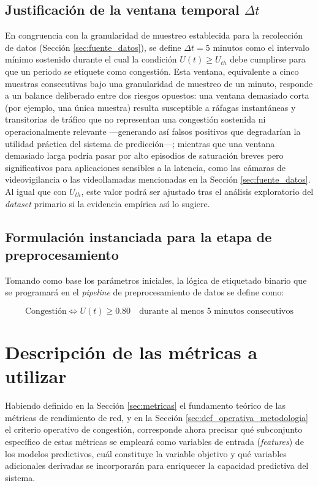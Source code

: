 \documentclass[12pt]{report}
\begin{document}
\subsection*{Justificación de la ventana temporal $\Delta t$}

En congruencia con la granularidad de muestreo establecida para la recolección de datos (Sección \ref{sec:fuente_datos}), se define $\Delta t = 5$ minutos como el intervalo mínimo sostenido durante el cual la condición $U(t) \geq U_{th}$ debe cumplirse para que un periodo se etiquete como congestión. Esta ventana, equivalente a cinco muestras consecutivas bajo una granularidad de muestreo de un minuto, responde a un balance deliberado entre dos riesgos opuestos: una ventana demasiado 
corta (por ejemplo, una única muestra) resulta susceptible a ráfagas instantáneas y transitorias de tráfico que no representan una congestión sostenida ni operacionalmente relevante ---generando así falsos positivos que degradarían la utilidad práctica del sistema de predicción---; mientras que una ventana demasiado larga podría pasar por alto episodios de saturación breves pero significativos para aplicaciones sensibles a la latencia, como las cámaras de videovigilancia o las 
videollamadas mencionadas en la Sección \ref{sec:fuente_datos}. Al igual que con $U_{th}$, este valor podrá ser ajustado tras el análisis exploratorio del \textit{dataset} primario si la evidencia empírica así lo sugiere.

\subsection*{Formulación instanciada para la etapa de preprocesamiento}

Tomando como base los parámetros iniciales, la lógica de etiquetado binario que se programará en el \textit{pipeline} de preprocesamiento de datos se define como:

\begin{equation}
    \mbox{Congestión} \iff U(t) \geq 0.80 \quad \mbox{durante al menos 5 minutos consecutivos}
    \label{eq:congestion_instanciada}
\end{equation}

\section{Descripción de las métricas a utilizar}
\label{sec:metricas_utilizar}

Habiendo definido en la Sección \ref{sec:metricas} el fundamento teórico de las métricas de rendimiento de red, y en la Sección \ref{sec:def_operativa_metodologia} el criterio operativo de congestión, corresponde ahora precisar qué subconjunto específico de estas métricas se empleará como variables de entrada (\textit{features}) de los modelos predictivos, cuál constituye la variable objetivo y qué variables adicionales derivadas se incorporarán para enriquecer la capacidad predictiva del sistema.
\end{document}
